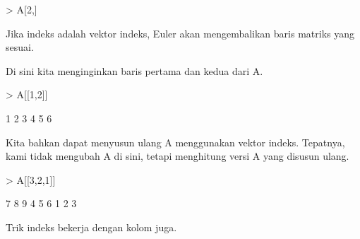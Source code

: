 \documentclass[a4paper,10pt]{article}
\begin{document}
\begin{eulernotebook}
\begin{eulercomment}
\begin{eulercomment}
\begin{eulercomment}
\begin{eulercomment}
\begin{eulercomment}
\begin{eulercomment}
\begin{eulerprompt}
> A[2,]
\end{eulerprompt}
\begin{euleroutput}
  [4,  5,  6]
\end{euleroutput}
\begin{eulercomment}
Jika indeks adalah vektor indeks, Euler akan mengembalikan baris
matriks yang sesuai.

Di sini kita menginginkan baris pertama dan kedua dari A.
\end{eulercomment}
\begin{eulerprompt}
> A[[1,2]]
\end{eulerprompt}
\begin{euleroutput}
              1             2             3 
              4             5             6 
\end{euleroutput}
\begin{eulercomment}
Kita bahkan dapat menyusun ulang A menggunakan vektor indeks.
Tepatnya, kami tidak mengubah A di sini, tetapi menghitung versi A
yang disusun ulang.
\end{eulercomment}
\begin{eulerprompt}
> A[[3,2,1]]
\end{eulerprompt}
\begin{euleroutput}
              7             8             9 
              4             5             6 
              1             2             3 
\end{euleroutput}
\begin{eulercomment}
Trik indeks bekerja dengan kolom juga.


\end{eulercomment}
\end{eulercomment}
\end{eulercomment}
\end{eulercomment}
\end{eulercomment}
\end{eulercomment}
\end{eulercomment}
\end{eulernotebook}
\end{document}
